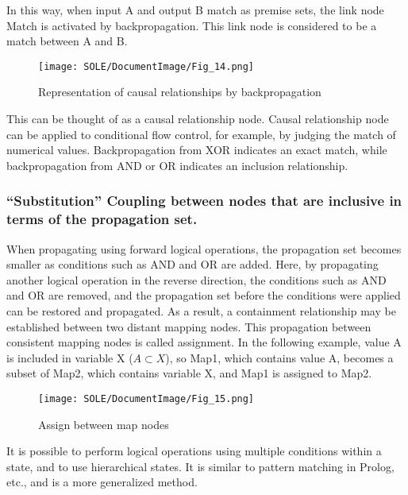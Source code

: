 \documentclass[12pt]{article}
\begin{document}
In this way, when input A and output B match as premise sets, the link
node Match is activated by backpropagation. This link node is considered
to be a match between A and B.

\begin{figure}[ht]
  \centering
  \texttt{[image: SOLE/DocumentImage/Fig\_14.png]}
  \caption{Representation of causal relationships by backpropagation}
  \label{fig:representation_of_causal_relationships_by_backpropagation}
\end{figure}

This can be thought of as a causal relationship node. Causal
relationship node can be applied to conditional flow control, for
example, by judging the match of numerical values. Backpropagation from
XOR indicates an exact match, while backpropagation from AND or OR
indicates an inclusion relationship.

\subsubsection{``Substitution'' Coupling between nodes that are
inclusive in terms of the propagation
set.}\label{substitution-coupling-between-nodes-that-are-inclusive-in-terms-of-the-propagation-set.}

When propagating using forward logical operations, the propagation set
becomes smaller as conditions such as AND and OR are added. Here, by
propagating another logical operation in the reverse direction, the
conditions such as AND and OR are removed, and the propagation set
before the conditions were applied can be restored and propagated. As a
result, a containment relationship may be established between two
distant mapping nodes. This propagation between consistent mapping nodes
is called assignment. In the following example, value A is included in
variable X (\(A \subset X\)), so Map1, which contains value A, becomes a
subset of Map2, which contains variable X, and Map1 is assigned to Map2.

\begin{figure}[ht]
  \centering
  \texttt{[image: SOLE/DocumentImage/Fig\_15.png]}
  \caption{Assign between map nodes}
  \label{fig:assign_between_map_nodes}
\end{figure}

It is possible to perform logical operations using multiple conditions
within a state, and to use hierarchical states. It is similar to pattern
matching in Prolog, etc., and is a more generalized method.
\end{document}
